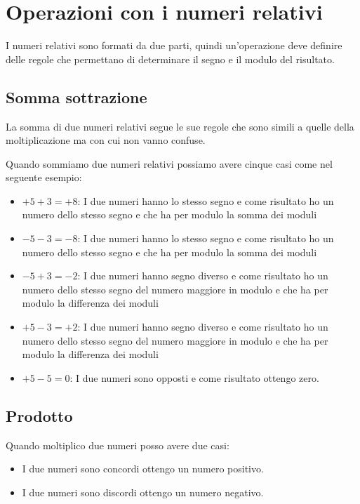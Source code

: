 \section{Operazioni con i numeri relativi}
\label{sec:Operazioniconnumerirelativi}
I numeri relativi sono formati da due parti, quindi un'operazione deve definire delle regole che permettano di determinare il segno e il modulo del risultato.
\subsection{Somma sottrazione}
La somma di due numeri relativi segue le sue regole che sono simili a quelle della moltiplicazione ma con cui non vanno confuse.

Quando sommiamo due numeri relativi possiamo avere cinque casi come nel seguente esempio:
\begin{itemize}
	\item $+5+3=+8$: I due numeri hanno lo stesso segno e come risultato ho un numero dello stesso segno e che ha per modulo la somma dei moduli
	\item $-5-3=-8$: I due numeri hanno lo stesso segno e come risultato ho un numero dello stesso segno e che ha per modulo la somma dei moduli
	\item $-5+3=-2$: I due numeri hanno segno diverso e come risultato ho un numero dello stesso segno del numero maggiore in modulo e che ha per modulo la differenza dei moduli
	\item $+5-3=+2$: I due numeri hanno segno diverso e come risultato ho un numero dello stesso segno del numero maggiore in modulo e che ha per modulo la differenza dei moduli
	\item $+5-5=0$: I due numeri sono opposti e come risultato ottengo zero.
\end{itemize}
\subsection{Prodotto}
Quando moltiplico due numeri posso avere due casi:
\begin{itemize}
	\item I due numeri sono concordi ottengo un numero positivo.
	\item I due numeri sono discordi ottengo un numero negativo.
\end{itemize}
